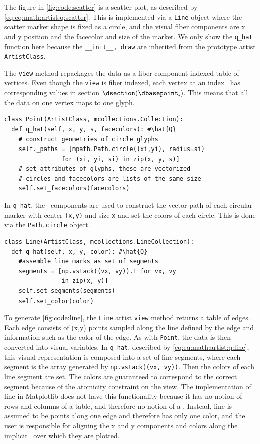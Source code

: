 \documentclass[../main.tex]{subfiles}
\begin{document}
The figure in \autoref{fig:code:scatter} is a scatter plot, as described by \autoref{eq:eq:math:artist:q:scatter}. This is implemented via a \texttt{Line} object where the scatter marker shape is fixed as a circle, and the visual fiber components are x and y position and the facecolor and size of the marker. We only show the \texttt{q_hat} function here because the \texttt{__init__, draw} are inherited from the prototype artist \texttt{ArtistClass}. 

The \texttt{view} method repackages the data as a fiber component indexed table of vertices. Even though the \texttt{view} is fiber indexed, each vertex at an index \dbasepoint\ has corresponding values in section $\dsection(\dbasepoint_{i})$. This means that all the data on one vertex maps to one glyph.
\begin{verbatim}
class Point(ArtistClass, mcollections.Collection):
  def q_hat(self, x, y, s, facecolors): #\hat{Q}
    # construct geometries of circle glyphs
    self._paths = [mpath.Path.circle((xi,yi), radius=si) 
                for (xi, yi, si) in zip(x, y, s)] 
    # set attributes of glyphs, these are vectorized 
    # circles and facecolors are lists of the same size
    self.set_facecolors(facecolors)
\end{verbatim} 
In \texttt{q_hat}, the \vsection\ components are used to construct the vector path of each circular marker with center \texttt{(x,y)} and size \texttt{x} and set the colors of each circle. This is done via the \texttt{Path.circle} object. 
\begin{verbatim}
class Line(ArtistClass, mcollections.LineCollection):
  def q_hat(self, x, y, color): #\hat{Q}
    #assemble line marks as set of segments 
    segments = [np.vstack((vx, vy)).T for vx, vy 
                in zip(x, y)]
    self.set_segments(segments)
    self.set_color(color)
\end{verbatim}
To generate \autoref{fig:code:line}, the \texttt{Line} artist \texttt{view} method returns a table of edges. Each edge consists of (x,y) points sampled along the line defined by the edge and information such as the color of the edge. As with \texttt{Point}, the data is then converted into visual variables. In \texttt{q_hat}, described by \autoref{eq:eq:math:artist:q:line}, this visual representation is composed into a set of line segments, where each segment is the array generated by \texttt{np.vstack((vx, vy))}. Then the colors of each line segment are set. The colors are guaranteed to correspond to the correct segment because of the atomicity constraint on the view. The implementation of line in Matplotlib does not have this functionality because it has no notion of rows and columns of a table, and therefore no notion of a \dsection. Instead, line is assumed to be points along one edge and therefore has only one color, and the user is responsible for aligning the x and y components and colors along the implicit \dbase\ over which they are plotted. 
\end{document}

